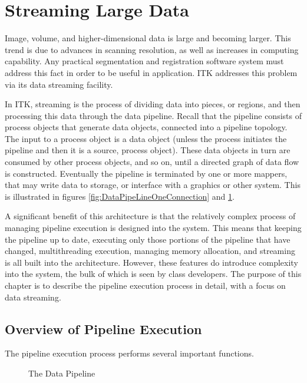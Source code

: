 \section{Streaming Large Data}
\label{sec:StreamingLargeData}

Image, volume, and higher-dimensional data is large and becoming larger. This
trend is due to advances in scanning resolution, as well as increases in
computing capability. Any practical segmentation and registration software
system must address this fact in order to be useful in application. ITK
addresses this problem via its data streaming facility.

In ITK, streaming is the process of dividing data into pieces, or regions,
and then processing this data through the data pipeline. Recall that the
pipeline consists of process objects that generate data objects, connected
into a pipeline topology. The input to a process object is a data object
(unless the process initiates the pipeline and then it is a source, process
object). These data objects in turn are consumed by other process objects,
and so on, until a directed graph of data flow is constructed. Eventually the
pipeline is terminated by one or more mappers, that may write data to
storage, or interface with a graphics or other system. This is illustrated in 
figures \ref{fig:DataPipeLineOneConnection} and \ref{fig:DataPipeLine}.

A significant benefit of this architecture is that the relatively complex
process of managing pipeline execution is designed into the system. This
means that keeping the pipeline up to date, executing only those portions of
the pipeline that have changed, multithreading execution, managing memory
allocation, and streaming is all built into the architecture. However, these
features do introduce complexity into the system, the bulk of which is seen
by class developers. The purpose of this chapter is to describe the pipeline
execution process in detail, with a focus on data streaming.


\subsection{Overview of Pipeline Execution}
\label{sec:OverviewPipelineExecution}

The pipeline execution process performs several important functions.

\begin{figure}
  \par\centering
  \caption{\label{fig:DataPipeLine}The Data Pipeline}
  \par
\end{figure}

